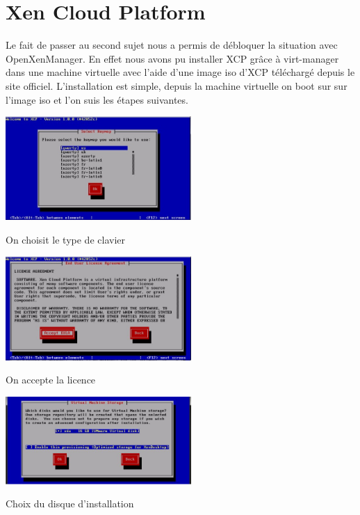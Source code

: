 \section{Xen Cloud Platform}
Le fait de passer au second sujet nous a permis de débloquer la situation avec OpenXenManager.
En effet nous avons pu installer XCP grâce à virt-manager dans une machine virtuelle avec l'aide d'une image iso d'XCP téléchargé depuis le site officiel.
L'installation est simple, depuis la machine virtuelle on boot sur sur l'image iso et l'on suis les étapes suivantes.
\begin{center}
\includegraphics[width=200pt]{images/1.png}
\end{center}
\begin{center}
On choisit le  type de clavier
\end{center}
\begin{center}
\includegraphics[width=200pt]{images/2.png}
\end{center}
\begin{center}
On accepte la licence
\end{center}
\begin{center}
\includegraphics[width=200pt]{images/3.png}
\end{center}
\begin{center}
Choix du disque d'installation
\end{center}
